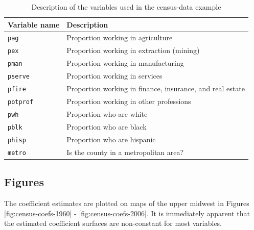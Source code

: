 	\begin{table}
		\begin{center}
		\begin{tabular}{ll}
			Variable name & Description \\
			\hline
			\verb!pag! & Proportion working in agriculture\\
			\verb!pex! &  Proportion working in extraction (mining)\\
			\verb!pman! & Proportion working in manufacturing \\
			\verb!pserve! & Proportion working in services \\
			\verb!pfire! & Proportion working in finance, insurance, and real estate \\
			\verb!potprof! & Proportion working in other professions \\
			\verb!pwh! & Proportion who are white \\
			\verb!pblk! & Proportion who are black \\
			\verb!phisp! & Proportion who are hispanic \\
			\verb!metro! & Is the county in a metropolitan area?\\
		\end{tabular}
		\caption{Description of the variables used in the census-data example\label{table:census-vars}}
		\end{center}		
	\end{table}
	
	\subsection{Figures}
	The coefficient estimates are plotted on maps of the upper midwest in Figures \ref{fig:census-coefs-1960} - \ref{fig:census-coefs-2006}. It is immediately apparent that the estimated coefficient surfaces are non-constant for most variables.\\
		
